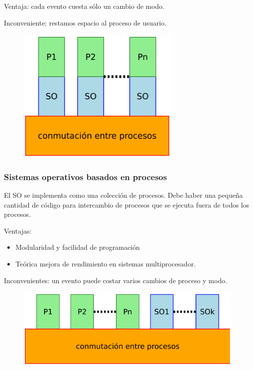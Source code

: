 \documentclass{article}
\begin{document}
Ventaja: cada evento cuesta sólo un cambio de modo.

Inconveniente: restamos espacio al proceso de usuario.
\begin{figure}[h]
\centering
\includegraphics[scale=1,width=80mm]{dentro_so.png}
\end{figure}

\subsubsection{Sistemas operativos basados en procesos}
El SO se implementa como una colección de procesos. Debe haber una pequeña cantidad de código para intercambio de procesos que se ejecuta fuera de todos los procesos.

Ventajas: 
\begin{itemize}
\item Modularidad y facilidad de programación

\item Teórica mejora de rendimiento en sistemas multiprocesador.
\end{itemize}

Inconvenientes: un evento puede costar varios cambios de proceso y modo.

\begin{figure}[h]
\centering
\includegraphics[scale=1, width=\textwidth]{procesos_so.png}
\end{figure}
\end{document}
